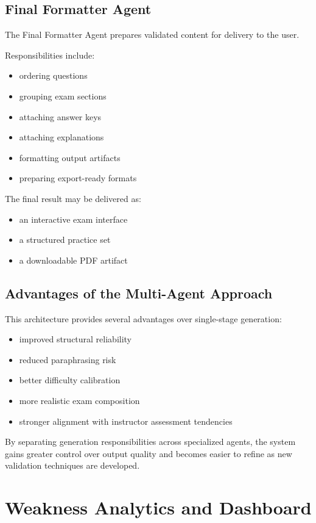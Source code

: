 \documentclass[11pt]{article}
\begin{document}
\subsection{Final Formatter Agent}
The Final Formatter Agent prepares validated content for delivery to the user.

Responsibilities include:

\begin{itemize}
\item ordering questions
\item grouping exam sections
\item attaching answer keys
\item attaching explanations
\item formatting output artifacts
\item preparing export-ready formats
\end{itemize}

The final result may be delivered as:

\begin{itemize}
\item an interactive exam interface
\item a structured practice set
\item a downloadable PDF artifact
\end{itemize}

\subsection{Advantages of the Multi-Agent Approach}
This architecture provides several advantages over single-stage generation:

\begin{itemize}
\item improved structural reliability
\item reduced paraphrasing risk
\item better difficulty calibration
\item more realistic exam composition
\item stronger alignment with instructor assessment tendencies
\end{itemize}

By separating generation responsibilities across specialized agents, the system gains greater control over output quality and becomes easier to refine as new validation techniques are developed.

\section{Weakness Analytics and Dashboard}
\end{document}
